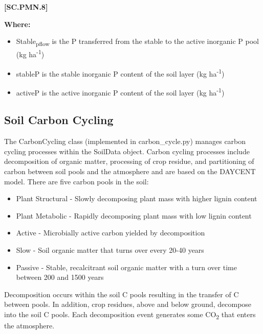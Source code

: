             {\raggedleft \textbf{[SC.PMN.8]}\par}
            \vspace{0.5cm}

        \textbf{Where:}
            
        \begin{itemize}
            \item Stable\textsubscript{pflow} is the P transferred from the stable to the active inorganic P pool (kg ha\textsuperscript{-1})
            \item stableP is the stable inorganic P content of the soil layer (kg ha\textsuperscript{-1})
            \item activeP is the active inorganic P content of the soil layer (kg ha\textsuperscript{-1})
        \end{itemize}
        \vspace{0.5cm}

\subsection{Soil Carbon Cycling}

The CarbonCycling class (implemented in carbon\_cycle.py) manages carbon cycling processes within the SoilData object. Carbon cycling processes include decomposition of organic matter, processing of crop residue, and partitioning of carbon between soil pools and the atmosphere and are based on the DAYCENT model. There are five carbon pools in the soil:
\vspace{0.2cm}
    \begin{itemize}
        \item Plant Structural - Slowly decomposing plant mass with higher lignin content
        \item Plant Metabolic - Rapidly decomposing plant mass with low lignin content
        \item Active - Microbially active carbon yielded by decomposition
        \item Slow - Soil organic matter that turns over every 20-40 years
        \item Passive - Stable, recalcitrant soil organic matter with a turn over time between 200 and 1500 years
    \end{itemize}
    \vspace{0.2cm}
Decomposition occurs within the soil C pools resulting in the transfer of C between pools. In addition, crop residues, above and below ground, decompose into the soil C pools. Each decomposition event generates some CO\textsubscript{2} that enters the atmosphere.
\vspace{0.5cm}

